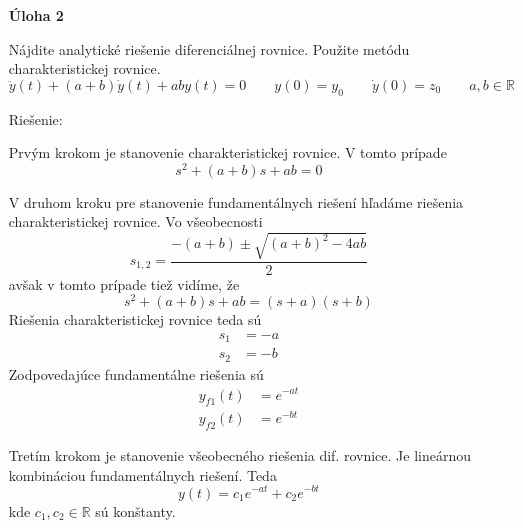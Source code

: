 \documentclass[a4paper, 10pt, ]{article}
\begin{document}
\begin{itemize}[leftmargin=0pt, labelsep=3mm, itemsep=0pt]
    

    \item[\textsf{\bfseries Úloha 2}] {\sffamily%
    Nájdite analytické riešenie diferenciálnej rovnice. Použite metódu charakteristickej rovnice.
    \begin{equation*} 
        \ddot y(t) + (a+b) \dot y(t) + a b y(t) = 0  \qquad y(0) = y_0 \qquad \dot y(0) = z_0 \qquad a,b \in \mathbb{R}
    \end{equation*}
    
    Riešenie:}

    Prvým krokom je stanovenie charakteristickej rovnice. V tomto prípade
    \begin{equation}
        s^2 + (a+b) s + a b = 0 
    \end{equation}

    V druhom kroku pre stanovenie fundamentálnych riešení hľadáme riešenia charakteristickej rovnice. Vo všeobecnosti
    \begin{equation}
        s_{1,2} = \frac{-(a + b) \pm \sqrt{(a + b)^2 - 4  ab}}{2}
    \end{equation}
    avšak v tomto prípade tiež vidíme, že
    \begin{equation}
        s^2 + (a+b) s + a b = (s + a)(s + b)
    \end{equation}
    Riešenia charakteristickej rovnice teda sú
    \begin{subequations}
        \begin{align}
            s_1 &= -a \\
            s_2 &= -b
        \end{align}
    \end{subequations}
    Zodpovedajúce fundamentálne riešenia sú
    \begin{subequations}
        \begin{align}
            y_{f1}(t) &= e^{-at} \\
            y_{f2}(t) &= e^{-bt}
        \end{align}
    \end{subequations}

    Tretím krokom je stanovenie všeobecného riešenia dif. rovnice. Je lineárnou kombináciou fundamentálnych riešení. Teda
    \begin{equation}
        y(t) = c_1 e^{-at} + c_2 e^{-bt}
    \end{equation}
    kde $c_1, c_2 \in \mathbb{R}$ sú konštanty.


\end{itemize}
\end{document}
